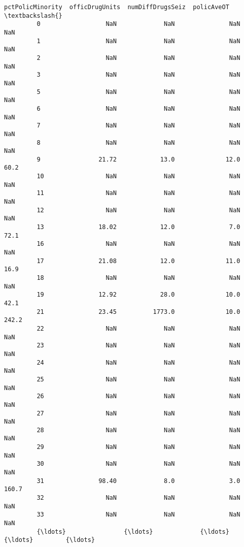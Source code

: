 \documentclass[11pt]{llncs}
\begin{document}
\begin{Verbatim}[commandchars=\\\{\}]
               pctPolicMinority  officDrugUnits  numDiffDrugsSeiz  policAveOT  \textbackslash{}
         0                  NaN             NaN               NaN         NaN   
         1                  NaN             NaN               NaN         NaN   
         2                  NaN             NaN               NaN         NaN   
         3                  NaN             NaN               NaN         NaN   
         5                  NaN             NaN               NaN         NaN   
         6                  NaN             NaN               NaN         NaN   
         7                  NaN             NaN               NaN         NaN   
         8                  NaN             NaN               NaN         NaN   
         9                21.72            13.0              12.0        60.2   
         10                 NaN             NaN               NaN         NaN   
         11                 NaN             NaN               NaN         NaN   
         12                 NaN             NaN               NaN         NaN   
         13               18.02            12.0               7.0        72.1   
         16                 NaN             NaN               NaN         NaN   
         17               21.08            12.0              11.0        16.9   
         18                 NaN             NaN               NaN         NaN   
         19               12.92            28.0              10.0        42.1   
         21               23.45          1773.0              10.0       242.2   
         22                 NaN             NaN               NaN         NaN   
         23                 NaN             NaN               NaN         NaN   
         24                 NaN             NaN               NaN         NaN   
         25                 NaN             NaN               NaN         NaN   
         26                 NaN             NaN               NaN         NaN   
         27                 NaN             NaN               NaN         NaN   
         28                 NaN             NaN               NaN         NaN   
         29                 NaN             NaN               NaN         NaN   
         30                 NaN             NaN               NaN         NaN   
         31               98.40             8.0               3.0       160.7   
         32                 NaN             NaN               NaN         NaN   
         33                 NaN             NaN               NaN         NaN   
         {\ldots}                {\ldots}             {\ldots}               {\ldots}         {\ldots}   

\end{Verbatim}
\end{document}
